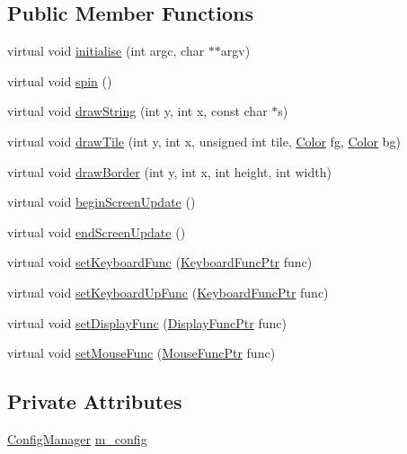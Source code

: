 \subsection*{Public Member Functions}
\begin{DoxyCompactItemize}
\item 
virtual void \hyperlink{classGraphics_a66b2e289d2963868a7c79cee2941942b}{initialise} (int argc, char $\ast$$\ast$argv)
\item 
virtual void \hyperlink{classGraphics_aec5a37f9c17f75ced39db3cf1167fa4a}{spin} ()
\item 
virtual void \hyperlink{classGraphics_adcad998ac1340c761645ed0c00412522}{draw\-String} (int y, int x, const char $\ast$s)
\item 
virtual void \hyperlink{classGraphics_a2bf550e92188fd991939f5d1429b7d4d}{draw\-Tile} (int y, int x, unsigned int tile, \hyperlink{classColor}{Color} fg, \hyperlink{classColor}{Color} bg)
\item 
virtual void \hyperlink{classGraphics_a0193f21f1333dcbe93c4759fcf1fb7d7}{draw\-Border} (int y, int x, int height, int width)
\item 
virtual void \hyperlink{classGraphics_a3bb97ab19f7abb7ad61f17614bdeb82e}{begin\-Screen\-Update} ()
\item 
virtual void \hyperlink{classGraphics_aaf60fa961c17a3007f3bb8ebddaa3006}{end\-Screen\-Update} ()
\item 
virtual void \hyperlink{classGraphics_a92c097e9ac471b361c9e72af40898cb9}{set\-Keyboard\-Func} (\hyperlink{graphics__interface_8h_ae8b5bc37678d3ba69d310ca3c6e7393f}{Keyboard\-Func\-Ptr} func)
\item 
virtual void \hyperlink{classGraphics_aaf99a21378b7bbc86d665212d8151f77}{set\-Keyboard\-Up\-Func} (\hyperlink{graphics__interface_8h_ae8b5bc37678d3ba69d310ca3c6e7393f}{Keyboard\-Func\-Ptr} func)
\item 
virtual void \hyperlink{classGraphics_a134f47e4496f56affd656660c6037e1d}{set\-Display\-Func} (\hyperlink{graphics__interface_8h_a71f99ab7c9bb1fb2ae09a63a9d4d422b}{Display\-Func\-Ptr} func)
\item 
virtual void \hyperlink{classGraphics_aa20c019aad3ded8495620a1b6d9bbbc1}{set\-Mouse\-Func} (\hyperlink{graphics__interface_8h_a60715b4a82a8c09c76ddd8b483d768ef}{Mouse\-Func\-Ptr} func)
\end{DoxyCompactItemize}
\subsection*{Private Attributes}
\begin{DoxyCompactItemize}
\item 
\hyperlink{classConfigManager}{Config\-Manager} \hyperlink{classGraphics_ab564a5716ae0bdaa73dde9f257e769d6}{m\-\_\-config}
\end{DoxyCompactItemize}


